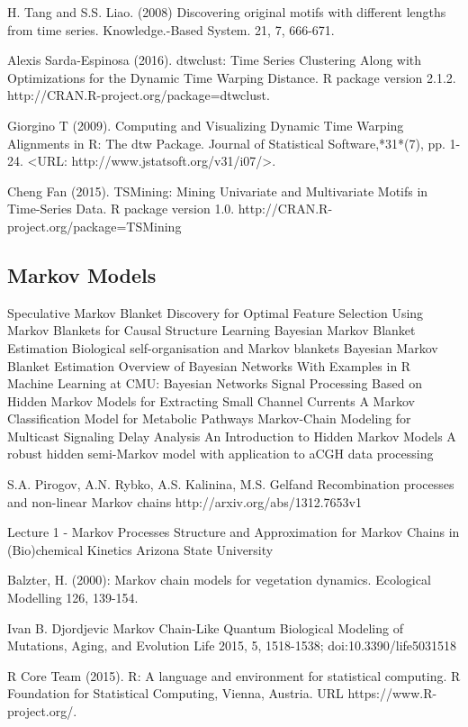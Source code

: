 \begin{thebibliography}{00}
 H. Tang and S.S. Liao. (2008)
\newblock Discovering original motifs with different lengths from time series. 
\newblock Knowledge.-Based System. 21, 7, 666-671. 

 Alexis Sarda-Espinosa (2016). 
\newblock dtwclust: Time Series Clustering Along with Optimizations for the Dynamic Time Warping Distance. 
R package version 2.1.2. http://CRAN.R-project.org/package=dtwclust.

  Giorgino T (2009). 
\newblock Computing and Visualizing Dynamic Time Warping Alignments in R: The dtw Package.
\newblock Journal of Statistical Software,*31*(7), pp. 1-24. <URL: http://www.jstatsoft.org/v31/i07/>.

 Cheng Fan (2015). 
\newblock TSMining: Mining Univariate and Multivariate Motifs in Time-Series Data. R package version 1.0.
\newblock http://CRAN.R-project.org/package=TSMining

\subsection{Markov Models}

 Speculative Markov Blanket Discovery for Optimal Feature Selection
 Using Markov Blankets for Causal Structure Learning
 Bayesian Markov Blanket Estimation
 Biological self-organisation and Markov blankets 
 Bayesian Markov Blanket Estimation
 Overview of Bayesian Networks With Examples in R
 Machine Learning at CMU: Bayesian  Networks
 Signal Processing Based on Hidden Markov Models for Extracting Small Channel Currents
 A Markov Classification Model for Metabolic Pathways
 Markov-Chain Modeling for Multicast Signaling Delay Analysis
 An Introduction to Hidden Markov Models
 A robust hidden semi-Markov model with application to aCGH data processing 

S.A. Pirogov, A.N. Rybko, A.S. Kalinina, M.S. Gelfand
\newblock Recombination processes and non-linear Markov chains
\newblock http://arxiv.org/abs/1312.7653v1

Lecture 1 - Markov Processes
\newblock Structure  and  Approximation  for  Markov  Chains in  (Bio)chemical  Kinetics
\newblock Arizona State University

Balzter, H. (2000): 
\newblock Markov chain models for vegetation dynamics. 
\newblock Ecological Modelling 126, 139-154.

Ivan B. Djordjevic
\newblock Markov Chain-Like Quantum Biological Modeling of Mutations, Aging, and Evolution 
\newblock Life 2015, 5, 1518-1538; doi:10.3390/life5031518 

R Core Team (2015). 
\newblock R: A language and environment for statistical computing. R Foundation for Statistical Computing, Vienna, Austria.
\newblock URL https://www.R-project.org/.
\end{thebibliography}


